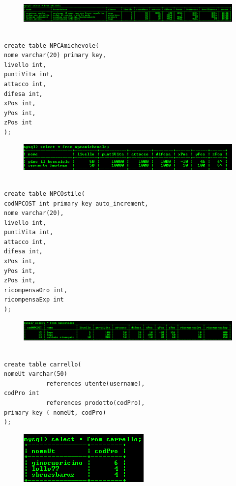 \begin{figure}[H]
\centering
\includegraphics[width=0.7\linewidth]{immagini/13}
\caption{}
\label{fig:1}
\end{figure}

\begin{verbatim}

create table NPCAmichevole( 
nome varchar(20) primary key, 
livello int, 
puntiVita int, 
attacco int, 
difesa int, 
xPos int, 
yPos int, 
zPos int
);
\end{verbatim}

\begin{figure}[H]
\centering
\includegraphics[width=0.7\linewidth]{immagini/14}
\caption{}
\label{fig:1}
\end{figure}

\begin{verbatim}

create table NPCOstile( 
codNPCOST int primary key auto_increment, 
nome varchar(20), 
livello int, 
puntiVita int, 
attacco int, 
difesa int, 
xPos int, 
yPos int, 
zPos int, 
ricompensaOro int, 
ricompensaExp int
);
\end{verbatim}

\begin{figure}[H]
\centering
\includegraphics[width=0.7\linewidth]{immagini/15}
\caption{}
\label{fig:1}
\end{figure}

\begin{verbatim}

create table carrello(
nomeUt varchar(50) 
			references utente(username), 
codPro int 
			references prodotto(codPro), 
primary key ( nomeUt, codPro)
);
\end{verbatim}

\begin{figure}[H]
\centering
\includegraphics[width=0.7\linewidth]{immagini/16}
\caption{}
\label{fig:1}
\end{figure}

